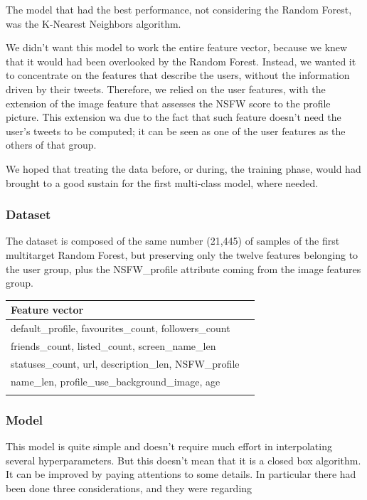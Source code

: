 The model that had the best performance, not considering the Random Forest, was the K-Nearest Neighbors algorithm.

We didn't want this model to work the entire feature vector, because we knew that it would had been overlooked by the Random Forest. Instead, we wanted it to concentrate on the features that describe the users, without the information driven by their tweets. Therefore, we relied on the user features, with the extension of the image feature that assesses the NSFW score to the profile picture. This extension wa due to the fact that such feature doesn't need the user's tweets to be computed; it can be seen as one of the user features as the others of that group.

We hoped that treating the data before, or during, the training phase, would had brought to a good sustain for the first multi-class model, where needed.

\subsubsection{Dataset}
The dataset is composed of the same number (21,445) of samples of the first multitarget Random Forest, but preserving only the twelve features belonging to the user group, plus the NSFW\_profile attribute coming from the image features group.

\small
\begin{center}
	\begin{tabular}{ll}
		\\Feature vector\\
		\hline\hline
		default\_profile, favourites\_count, followers\_count\\
		friends\_count, listed\_count, screen\_name\_len\\
		statuses\_count, url, description\_len, NSFW\_profile\\
		name\_len, profile\_use\_background\_image, age\\\hline\\
	\end{tabular}
\end{center}
\normalsize

\subsubsection{Model}

This model is quite simple and doesn't require much effort in interpolating several hyperparameters. But this doesn't mean that it is a closed box algorithm. It can be improved by paying attentions to some details. In particular there had been done three considerations, and they were regarding


